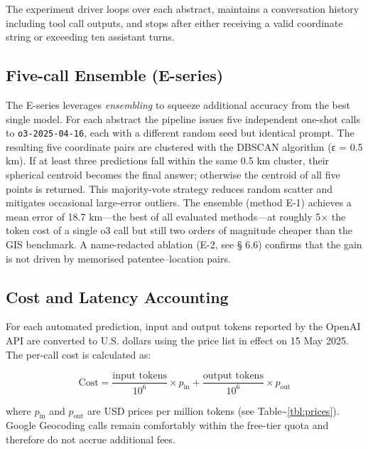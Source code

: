 The experiment driver loops over each abstract, maintains a conversation
history including tool call outputs, and stops after either receiving a
valid coordinate string or exceeding ten assistant turns.

\subsection{Five-call Ensemble
(E-series)}\label{five-call-ensemble-e-series}

The E-series leverages \emph{ensembling} to squeeze additional accuracy
from the best single model. For each abstract the pipeline issues five
independent one-shot calls to \passthrough{\lstinline!o3-2025-04-16!},
each with a different random seed but identical prompt. The resulting
five coordinate pairs are clustered with the DBSCAN algorithm (ε = 0.5
km). If at least three predictions fall within the same 0.5 km cluster,
their spherical centroid becomes the final answer; otherwise the
centroid of all five points is returned. This majority-vote strategy
reduces random scatter and mitigates occasional large-error outliers.
The ensemble (method E-1) achieves a mean error of 18.7 km---the best of
all evaluated methods---at roughly 5× the token cost of a single o3 call
but still two orders of magnitude cheaper than the GIS benchmark. A
name-redacted ablation (E-2, see § 6.6) confirms that the gain is not
driven by memorised patentee--location pairs.

\subsection{Cost and Latency
Accounting}\label{cost-and-latency-accounting}

For each automated prediction, input and output tokens reported by the
OpenAI API are converted to U.S. dollars using the price list in effect
on 15 May 2025. The per-call cost is calculated as:

\[
\text{Cost} = \frac{\text{input tokens}}{10^{6}} \times p_{\text{in}} + \frac{\text{output tokens}}{10^{6}} \times p_{\text{out}}
\]

where \(p_{\text{in}}\) and \(p_{\text{out}}\) are USD prices per
million tokens (see Table\textasciitilde{}\ref{tbl:prices}). Google
Geocoding calls remain comfortably within the free-tier quota and
therefore do not accrue additional fees.

